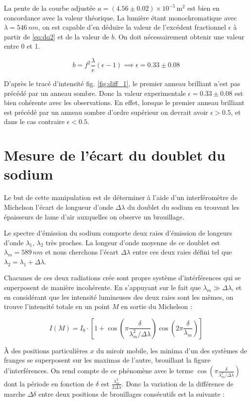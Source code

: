 \documentclass{article}
\begin{document}
La pente de la courbe adjustée $a=(4.56\pm0.02)\times10^{-5} \,\textrm{m}^2$ est bien en concordance avec la valeur théorique. 
La lumière étant monochromatique avec $\lambda = 546 \,\unit{nm}$, on est capable d'en déduire la valeur de l'excédent fractionnel $\epsilon$ à partir de 
\eqref{eq:dq2} et de la valeur de $b$. On doit nécessairement obtenir une valeur entre 0 et 1.

$$ b = f^2 \frac{\lambda}{e}(\epsilon - 1) \implies \epsilon = 0.33 \pm 0.08$$

D'après le tracé d'intensité fig. \ref{fig:diff_1}, le premier anneau brilliant n'est pas précédé par un anneau sombre.
Donc la valeur experimentale $\epsilon = 0.33 \pm 0.08$ est bien cohérente avec les observations. 
En effet, lorsque le premier anneau brilliant est précédé par un anneau sombre d'ordre supérieur on devrait avoir $\epsilon > 0.5$, et dans le cas contraire
 $\epsilon < 0.5$. 


\newpage

\section{Mesure de l'écart du doublet du sodium}

Le but de cette manipulation est de déterminer à l’aide d’un interféromètre de Michelson 
l’écart de longueur d’onde $\Delta \lambda$ du doublet du sodium en trouvant les épaisseurs de lame d’air 
auxquelles on observe un brouillage.

Le spectre d'émission du sodium comporte deux raies d'émission de longeurs d'onde $\lambda_1$, $\lambda_2$ très proches.
La longeur d'onde moyenne de ce doublet est $\lambda_m = 589 \,\unit{nm}$ et nous cherchons l'écart $\Delta \lambda$ entre ces deux raies 
défini tel que $\lambda_2 = \lambda_1 + \Delta \lambda$.

Chacunes de ces deux radiations crée sont propre système d'intérférences qui se superposent de manière 
incohérente. En s'appuyant sur le fait que $\lambda_m \gg \Delta \lambda$, et en considérant que les intensité lumineuses
 des deux raies sont les mêmes, on trouve l'intensité totale en un point $M$ en sortie du Michelson :

\begin{equation}
I(M)=I_0 \cdot\left[1+\cos \left(\pi \frac{\delta}{\lambda_m^2 / \Delta \lambda}\right) \cos \left(2 \pi \frac{\delta}{\lambda_m}\right)\right]
\end{equation}

À des positions particulières $x$ du miroir mobile, les minima d'un des systèmes de franges se superposent sur les maximas de l'autre, 
brouillant la figure d'interférences. On rend compte de ce phénomène avec le terme $\cos \left(\pi \frac{\delta}{\lambda_m^2 / \Delta \lambda}\right)$ 
dont la période en fonction de $\delta$ est $\frac{\lambda_m^2}{2\Delta \lambda}$. Donc la variation de la différence de marche $\Delta \delta$ entre deux positions de brouillages consécutifs est la suivante :
\end{document}

